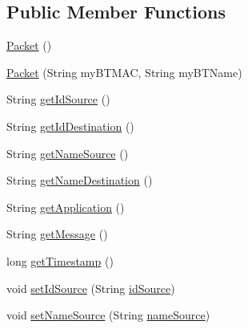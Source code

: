 \subsection*{Public Member Functions}
\begin{DoxyCompactItemize}
\item 
\hyperlink{classcom_1_1copelabs_1_1oiframework_1_1contentmanager_1_1_packet_a9b0e3e17127c15ba5ad44b4396113d0c}{Packet} ()
\item 
\hyperlink{classcom_1_1copelabs_1_1oiframework_1_1contentmanager_1_1_packet_a74503db32ef14429d932299a845a4c5f}{Packet} (String my\+B\+T\+M\+A\+C, String my\+B\+T\+Name)
\item 
String \hyperlink{classcom_1_1copelabs_1_1oiframework_1_1contentmanager_1_1_packet_acf75d58669cda28fa1d818de593d1eae}{get\+Id\+Source} ()
\item 
String \hyperlink{classcom_1_1copelabs_1_1oiframework_1_1contentmanager_1_1_packet_a567a7f33e7d0881b7b17cd062c1c914e}{get\+Id\+Destination} ()
\item 
String \hyperlink{classcom_1_1copelabs_1_1oiframework_1_1contentmanager_1_1_packet_adf672b7b0eb80a618d960a2be9cefc1d}{get\+Name\+Source} ()
\item 
String \hyperlink{classcom_1_1copelabs_1_1oiframework_1_1contentmanager_1_1_packet_acf4553b8748cabd0752afdaa0118339b}{get\+Name\+Destination} ()
\item 
String \hyperlink{classcom_1_1copelabs_1_1oiframework_1_1contentmanager_1_1_packet_a608fe53a0f1cf7db5f095c0f08d8cf0b}{get\+Application} ()
\item 
String \hyperlink{classcom_1_1copelabs_1_1oiframework_1_1contentmanager_1_1_packet_af294a6659b9b41a1d9fefedb39d214ee}{get\+Message} ()
\item 
long \hyperlink{classcom_1_1copelabs_1_1oiframework_1_1contentmanager_1_1_packet_adf3631e8d5d881eb635310aad9fceda6}{get\+Timestamp} ()
\item 
void \hyperlink{classcom_1_1copelabs_1_1oiframework_1_1contentmanager_1_1_packet_adbe1eedb580234ed8de7f670b90e6888}{set\+Id\+Source} (String \hyperlink{classcom_1_1copelabs_1_1oiframework_1_1contentmanager_1_1_packet_a68fee5247a550b8031b23b3f6bff6fca}{id\+Source})
\item 
void \hyperlink{classcom_1_1copelabs_1_1oiframework_1_1contentmanager_1_1_packet_a75e55f0f846942ada59fe2cdc02db0c7}{set\+Name\+Source} (String \hyperlink{classcom_1_1copelabs_1_1oiframework_1_1contentmanager_1_1_packet_ab73e6d976a992429142df8223a1be7e6}{name\+Source})
\item 

\end{DoxyCompactItemize}
